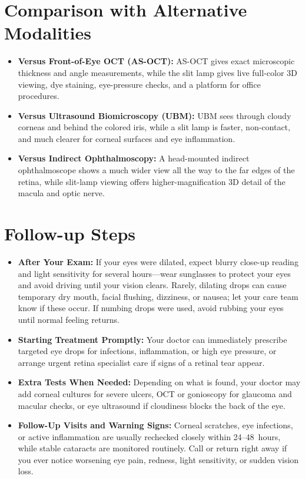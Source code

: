 \section{Comparison with Alternative Modalities}

\begin{itemize}
    \item \textbf{Versus Front-of-Eye OCT (AS-OCT):} AS-OCT gives exact microscopic thickness and angle measurements, while the slit lamp gives live full-color 3D viewing, dye staining, eye-pressure checks, and a platform for office procedures.
    \item \textbf{Versus Ultrasound Biomicroscopy (UBM):} UBM sees through cloudy corneas and behind the colored iris, while a slit lamp is faster, non-contact, and much clearer for corneal surfaces and eye inflammation.
    \item \textbf{Versus Indirect Ophthalmoscopy:} A head-mounted indirect ophthalmoscope shows a much wider view all the way to the far edges of the retina, while slit-lamp viewing offers higher-magnification 3D detail of the macula and optic nerve.
\end{itemize}

\section{Follow-up Steps}

\begin{itemize}
    \item \textbf{After Your Exam:} If your eyes were dilated, expect blurry close-up reading and light sensitivity for several hours---wear sunglasses to protect your eyes and avoid driving until your vision clears. Rarely, dilating drops can cause temporary dry mouth, facial flushing, dizziness, or nausea; let your care team know if these occur. If numbing drops were used, avoid rubbing your eyes until normal feeling returns.
    \item \textbf{Starting Treatment Promptly:} Your doctor can immediately prescribe targeted eye drops for infections, inflammation, or high eye pressure, or arrange urgent retina specialist care if signs of a retinal tear appear.
    \item \textbf{Extra Tests When Needed:} Depending on what is found, your doctor may add corneal cultures for severe ulcers, OCT or gonioscopy for glaucoma and macular checks, or eye ultrasound if cloudiness blocks the back of the eye.
    \item \textbf{Follow-Up Visits and Warning Signs:} Corneal scratches, eye infections, or active inflammation are usually rechecked closely within 24--48~hours, while stable cataracts are monitored routinely. Call or return right away if you ever notice worsening eye pain, redness, light sensitivity, or sudden vision loss.
\end{itemize}

